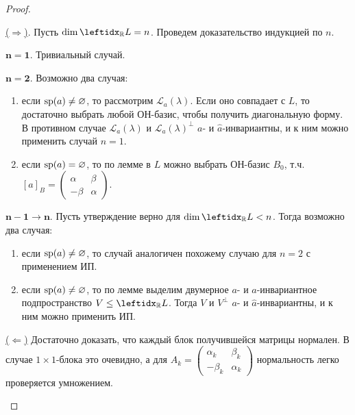 \begin{proof}
    \begin{proofpart}
        \underline{($\Rightarrow$)}. Пусть $\dim \lsub{\mathbb{R}}{L} = n$. Проведем доказательство индукцией по $n$.
        \smallskip
        
        $\mathbf{n = 1}$. Тривиальный случай.
        
        $\mathbf{n = 2}$. Возможно два случая:
        \begin{enumerate}
            \item если $\operatorname{sp}(a) \neq \varnothing$, то рассмотрим $\mathcal{L}_a(\lambda)$. Если оно совпадает с $L$, то достаточно выбрать любой ОН-базис, чтобы получить диагональную форму. В противном случае $\mathcal{L}_a(\lambda)$ и $\mathcal{L}_a(\lambda)^\perp$ $a$- и $\hat{a}$-инвариантны, и к ним можно применить случай $n = 1$.
            \item если $\operatorname{sp}(a) = \varnothing$, то по лемме в $L$ можно выбрать ОН-базис $B_0$, т.ч. $[a]_B = \begin{pmatrix}
                \alpha & \beta \\
                -\beta & \alpha
            \end{pmatrix}$.
        \end{enumerate}
    
        $\mathbf{n - 1 \to n}$. Пусть утверждение верно для $\dim \lsub{\mathbb{R}}{L} < n$. Тогда возможно два случая:
        \begin{enumerate}
            \item если $\operatorname{sp}(a) \neq \varnothing$, то случай аналогичен похожему случаю для $n = 2$ с применением ИП.
            \item если $\operatorname{sp}(a) \neq \varnothing$, то по лемме выделим двумерное $a$- и $\hat{a}$-инвариантное подпространство $V \le \lsub{\mathbb{R}}{L}$. Тогда $V$ и $V^\perp$ $a$- и $\hat{a}$-инвариантны, и к ним можно применить ИП.
        \end{enumerate}
        \smallskip
        
        \underline{($\Leftarrow$)} Достаточно доказать, что каждый блок получившейся матрицы нормален. В случае $1 \times 1$-блока это очевидно, а для $A_k = \begin{pmatrix}
            \alpha_k & \beta_k \\
            -\beta_k & \alpha_k
        \end{pmatrix}$ нормальность легко проверяется умножением.
    \end{proofpart}


\end{proof}
